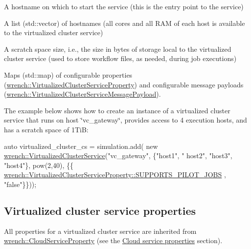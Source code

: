 \begin{DoxyItemize}
\item A hostname on which to start the service (this is the entry point to the service)
\item A list ({\ttfamily std\+::vector}) of hostnames (all cores and all R\+AM of each host is available to the virtualized cluster service)
\item A scratch space size, i.\+e., the size in bytes of storage local to the virtualized cluster service (used to store workflow files, as needed, during job executions)
\item Maps ({\ttfamily std\+::map}) of configurable properties ({\ttfamily \hyperlink{classwrench_1_1_virtualized_cluster_service_property}{wrench\+::\+Virtualized\+Cluster\+Service\+Property}}) and configurable message payloads ({\ttfamily \hyperlink{classwrench_1_1_virtualized_cluster_service_message_payload}{wrench\+::\+Virtualized\+Cluster\+Service\+Message\+Payload}}).
\end{DoxyItemize}

The example below shows how to create an instance of a virtualized cluster service that runs on host \char`\"{}vc\+\_\+gateway\char`\"{}, provides access to 4 execution hosts, and has a scratch space of 1\+TiB\+:


\begin{DoxyCode}
\textcolor{keyword}{auto} virtualized\_cluster\_cs = simulation.add(
          \textcolor{keyword}{new} \hyperlink{classwrench_1_1_virtualized_cluster_service}{wrench::VirtualizedClusterService}(\textcolor{stringliteral}{"vc\_gateway"}, \{\textcolor{stringliteral}{"host1"}, \textcolor{stringliteral}{"
      host2"}, \textcolor{stringliteral}{"host3"}, \textcolor{stringliteral}{"host4"}\}, pow(2,40),
                                                \{\{
      \hyperlink{classwrench_1_1_compute_service_property_af0abab1e3bce4932c4482031f0c31ce8}{wrench::VirtualizedClusterServiceProperty::SUPPORTS\_PILOT\_JOBS}
      , \textcolor{stringliteral}{"false"}\}\}));
\end{DoxyCode}
\hypertarget{guide-virtualizedcluster_guide-virtualizedcluster-creating-properties}{}\subsection{Virtualized cluster service properties}\label{guide-virtualizedcluster_guide-virtualizedcluster-creating-properties}
All properties for a virtualized cluster service are inherited from {\ttfamily \hyperlink{classwrench_1_1_cloud_service_property}{wrench\+::\+Cloud\+Service\+Property}} (see the \hyperlink{guide-cloud_guide-cloud-creating-properties}{Cloud service properties} section). 